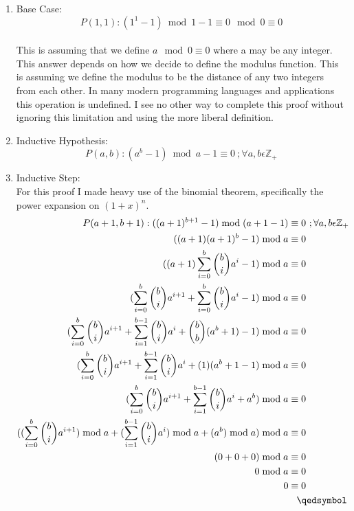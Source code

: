 \documentclass[12pt]{article}
\begin{document}
\begin{enumerate}
\item Base Case:\\
\[P(1,1):(1^1 - 1)\bmod{1 - 1}\equiv 0 \mod 0 \equiv 0\]\\
This is assuming that we define \begin{math}a \mod 0 \equiv 0\end{math} where a may be any integer. This answer depends on how we decide to define the modulus function. This is assuming we define the modulus to be the distance of any two integers from each other. In many modern programming languages and applications this operation is undefined. I see no other way to complete this proof without ignoring this limitation and using the more liberal definition.
\item Inductive Hypothesis:
\[P(a,b):(a^b - 1)\bmod{a - 1}\equiv 0\ ; \forall a,b \epsilon \mathbb{Z}_+\]
\item Inductive Step:\\
For this proof I made heavy use of the binomial theorem, specifically the power expansion on \begin{math}(1+x)^n\end{math}.
\begin{align*}
P(a+1,b+1):((a+1)^{b+1} - 1)\bmod{(a + 1 - 1)}&\equiv 0\ ; \forall a,b \epsilon \mathbb{Z}_+\\
((a+1)(a+1)^b - 1)\bmod{a}&\equiv 0\\
((a+1)\sum\limits_{i = 0}^{b} {b \choose i} a^i - 1)\bmod{a}&\equiv 0\\
(\sum\limits_{i = 0}^{b} {b \choose i} a^{i+1} + \sum\limits_{i = 0}^{b} {b \choose i} a^i - 1)\bmod{a}&\equiv 0\\
(\sum\limits_{i = 0}^{b} {b \choose i} a^{i+1} + \sum\limits_{i = 1}^{b - 1} {b \choose i} a^i + {b \choose b}(a^b + 1) - 1)\bmod{a}&\equiv 0\\
(\sum\limits_{i = 0}^{b} {b \choose i} a^{i+1} + \sum\limits_{i = 1}^{b - 1} {b \choose i} a^i + (1)(a^b + 1 - 1)\bmod{a}&\equiv 0\\
(\sum\limits_{i = 0}^{b} {b \choose i} a^{i+1} + \sum\limits_{i = 1}^{b - 1} {b \choose i} a^i + a^b)\bmod{a}&\equiv 0\\
((\sum\limits_{i = 0}^{b} {b \choose i} a^{i+1})\bmod{a} + (\sum\limits_{i = 1}^{b - 1} {b \choose i} a^i)\bmod{a} + (a^b)\bmod{a})\bmod{a}&\equiv 0\\
(0 + 0 + 0)\bmod{a}&\equiv 0\\
0\bmod{a}&\equiv 0\\
0&\equiv 0\\
&\hspace{0.3cm}\qedsymbol
\end{align*}
\end{enumerate}
\end{document}
